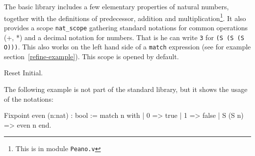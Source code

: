 The basic library includes a few elementary properties of natural
numbers, together with the definitions of predecessor, addition and
multiplication\footnote{This is in module {\tt Peano.v}}. It also
provides a scope {\tt nat\_scope} gathering standard notations for
common operations (+, *) and a decimal notation for numbers. That is he
can write \texttt{3} for \texttt{(S (S (S O)))}. This also works on
the left hand side of a \texttt{match} expression (see for example
section~\ref{refine-example}). This scope is opened by default.

\begin{coq_eval}
Reset Initial.
\end{coq_eval}

The following example is not part of the standard library, but it
shows the usage of the notations:

\begin{coq_example*}
Fixpoint even (n:nat) : bool :=
  match n with
  | 0 => true
  | 1 => false
  | S (S n) => even n
  end.
\end{coq_example*}



